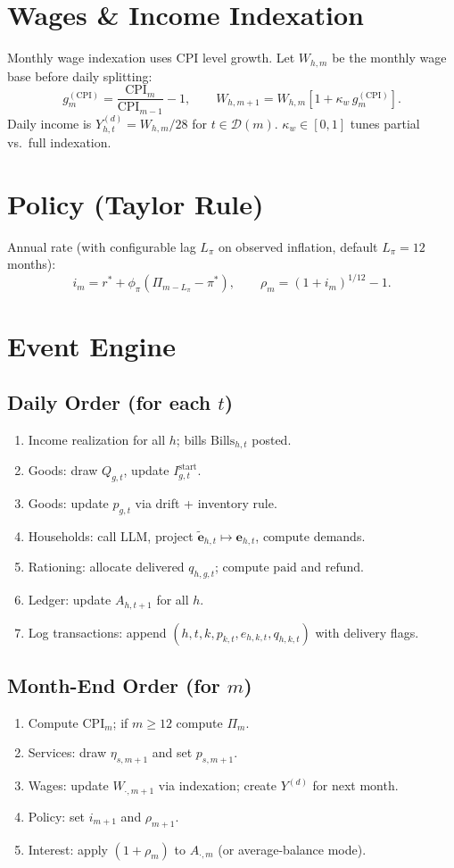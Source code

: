 \documentclass[12pt]{article}
\begin{document}
\section{Wages \& Income Indexation}\label{sec:wages}
Monthly wage indexation uses CPI level growth. Let $W_{h,m}$ be the monthly wage base before daily splitting:
$$
g_m^{(\mathrm{CPI})}=\frac{\mathrm{CPI}_m}{\mathrm{CPI}_{m-1}}-1,\qquad
W_{h,m+1}=W_{h,m}\left[1+\kappa_w\,g_m^{(\mathrm{CPI})}\right].
$$
Daily income is $Y_{h,t}^{(d)}=W_{h,m}/28$ for $t\in\mathcal{D}(m)$. $\kappa_w\in[0,1]$ tunes partial vs.\ full indexation.

\section{Policy (Taylor Rule)}
Annual rate (with configurable lag $L_{\pi}$ on observed inflation, default $L_{\pi}=12$ months):
$$
i_m=r^\ast+\phi_\pi\left(\Pi_{m-L_{\pi}}-\pi^\ast\right),\qquad
\rho_m=(1+i_m)^{1/12}-1.
$$

\section{Event Engine}
\subsection*{Daily Order (for each $t$)}
\begin{enumerate}
  \item Income realization for all $h$; bills $\mathrm{Bills}_{h,t}$ posted.
  \item Goods: draw $Q_{g,t}$, update $I^{\mathrm{start}}_{g,t}$.
  \item Goods: update $p_{g,t}$ via drift + inventory rule.
  \item Households: call LLM, project $\tilde{\mathbf{e}}_{h,t}\mapsto \mathbf{e}_{h,t}$, compute demands.
  \item Rationing: allocate delivered $q_{h,g,t}$; compute $\text{paid}$ and $\text{refund}$.
  \item Ledger: update $A_{h,t+1}$ for all $h$.
  \item Log transactions: append $(h,t,k,p_{k,t},e_{h,k,t},q_{h,k,t})$ with delivery flags.
\end{enumerate}

\subsection*{Month-End Order (for $m$)}
\begin{enumerate}
  \item Compute $\mathrm{CPI}_m$; if $m\ge 12$ compute $\Pi_m$.
  \item Services: draw $\eta_{s,m+1}$ and set $p_{s,m+1}$.
  \item Wages: update $W_{\cdot,m+1}$ via indexation; create $Y^{(d)}$ for next month.
  \item Policy: set $i_{m+1}$ and $\rho_{m+1}$.
  \item Interest: apply $(1+\rho_m)$ to $A_{\cdot,m}$ (or average-balance mode).
\end{enumerate}
\end{document}
